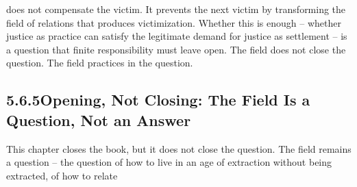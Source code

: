 does not compensate the victim. It prevents the next victim by transforming the field of relations that produces victimization. Whether this is enough – whether justice as practice can satisfy the legitimate demand for justice as settlement – is a question that finite responsibility must leave open. The field does not close the question. The field practices in the question.

\subsection{5.6.5\quad Opening, Not Closing: The Field Is a Question, Not an Answer}

This chapter closes the book, but it does not close the question. The field remains a question – the question of how to live in an age of extraction without being extracted, of how to relate

